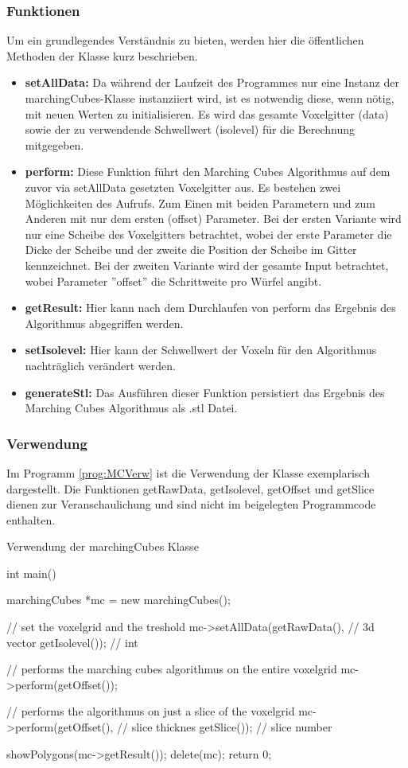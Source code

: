 \subsubsection{Funktionen}
Um ein grundlegendes Verständnis zu bieten, werden hier die öffentlichen Methoden der Klasse kurz beschrieben. \\
\begin{itemize}
	\item \textbf{setAllData:} Da während der Laufzeit des Programmes nur eine Instanz der marchingCubes-Klasse instanziiert wird, ist es notwendig diese, wenn nötig, mit neuen Werten zu initialisieren. Es wird das gesamte Voxelgitter (data) sowie der zu verwendende Schwellwert (isolevel) für die Berechnung mitgegeben.
	\item \textbf{perform:} Diese Funktion führt den Marching Cubes Algorithmus auf dem zuvor via setAllData gesetzten Voxelgitter aus. Es bestehen zwei Möglichkeiten des Aufrufs. Zum Einen mit beiden Parametern und zum Anderen mit nur dem ersten (offset) Parameter. Bei der ersten Variante wird nur eine Scheibe des Voxelgitters betrachtet, wobei der erste Parameter die Dicke der Scheibe und der zweite die Position der Scheibe im Gitter kennzeichnet. Bei der zweiten Variante wird der gesamte Input betrachtet, wobei Parameter ''offset'' die Schrittweite pro Würfel angibt. 
	\item \textbf{getResult:} Hier kann nach dem Durchlaufen von perform das Ergebnis des Algorithmus abgegriffen werden. 
	\item \textbf{setIsolevel:} Hier kann der Schwellwert der Voxeln für den Algorithmus nachträglich verändert werden.
	\item \textbf{generateStl:} Das Ausführen dieser Funktion persistiert das Ergebnis des Marching Cubes Algorithmus als .stl Datei.
\end{itemize}
\subsubsection{Verwendung}
Im Programm \ref{prog:MCVerw} ist die Verwendung der Klasse exemplarisch dargestellt. Die Funktionen getRawData, getIsolevel, getOffset und getSlice dienen zur Veranschaulichung und sind nicht im beigelegten Programmcode enthalten. 
\begin{program}[H]
	\caption{Verwendung der marchingCubes Klasse}
	\label{prog:MCVerw}
	\begin{CCode}
		int main(){
			marchingCubes *mc = new marchingCubes();
			
			// set the voxelgrid and the treshold
			mc->setAllData(getRawData(),   // 3d vector  
						   getIsolevel()); // int
			
			// performs the marching cubes algorithmus on the entire voxelgrid
			mc->perform(getOffset()); 
			
			// performs the algorithmus on just a slice of the voxelgrid 
			mc->perform(getOffset(), // slice thicknes 
						getSlice()); // slice number
			
			showPolygons(mc->getResult()); 
			delete(mc);
			return 0;	
		}
	\end{CCode}
\end{program}
